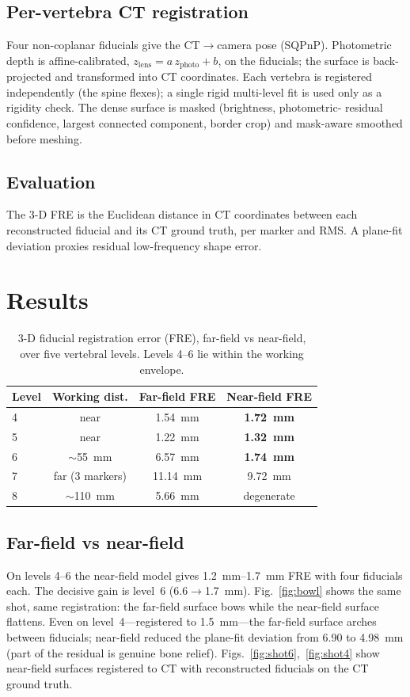 \documentclass[11pt]{article}
\begin{document}
\subsection{Per-vertebra CT registration}
Four non-coplanar fiducials give the CT$\to$camera pose (SQPnP). Photometric depth
is affine-calibrated, $z_{\text{lens}}=a\,z_{\text{photo}}+b$, on the fiducials;
the surface is back-projected and transformed into CT coordinates. Each vertebra is
registered independently (the spine flexes); a single rigid multi-level fit is used
only as a rigidity check. The dense surface is masked (brightness, photometric-
residual confidence, largest connected component, border crop) and mask-aware
smoothed before meshing.

\subsection{Evaluation}
The 3-D FRE is the Euclidean distance in CT coordinates between each reconstructed
fiducial and its CT ground truth, per marker and RMS. A plane-fit deviation proxies
residual low-frequency shape error.

\section{Results}
\begin{table}[h]\centering
\caption{3-D fiducial registration error (FRE), far-field vs near-field, over five
vertebral levels. Levels 4--6 lie within the working envelope.}
\begin{tabular}{lccc}
\toprule
Level & Working dist. & Far-field FRE & Near-field FRE\\
\midrule
4 & near & \SI{1.54}{\mm} & \textbf{\SI{1.72}{\mm}}\\
5 & near & \SI{1.22}{\mm} & \textbf{\SI{1.32}{\mm}}\\
6 & $\sim$\SI{55}{\mm} & \SI{6.57}{\mm} & \textbf{\SI{1.74}{\mm}}\\
7 & far (3 markers) & \SI{11.14}{\mm} & \SI{9.72}{\mm}\\
8 & $\sim$\SI{110}{\mm} & \SI{5.66}{\mm} & degenerate\\
\bottomrule
\end{tabular}
\end{table}

\subsection{Far-field vs near-field}
On levels 4--6 the near-field model gives \SIrange{1.2}{1.7}{\mm} FRE with four
fiducials each. The decisive gain is level~6 (\num{6.6}$\to$\SI{1.7}{\mm}).
Fig.~\ref{fig:bowl} shows the same shot, same registration: the far-field surface
bows while the near-field surface flattens. Even on level~4---registered to
\SI{1.5}{\mm}---the far-field surface arches between fiducials; near-field reduced
the plane-fit deviation from \num{6.90} to \SI{4.98}{\mm} (part of the residual is
genuine bone relief). Figs.~\ref{fig:shot6},~\ref{fig:shot4} show near-field
surfaces registered to CT with reconstructed fiducials on the CT ground truth.
\end{document}
